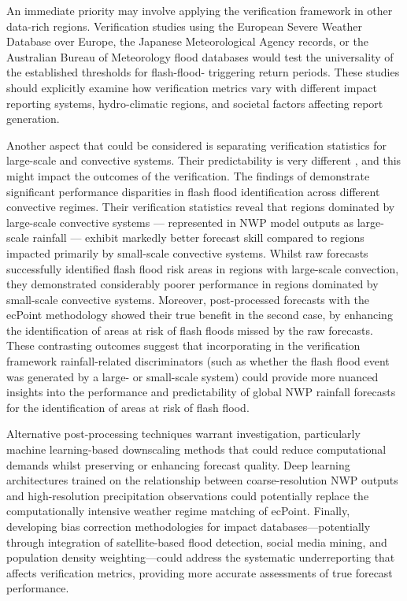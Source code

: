 An immediate priority may involve applying the verification framework in other data-rich regions. Verification studies using the European Severe Weather Database over Europe, the Japanese Meteorological Agency records, or the Australian Bureau of Meteorology flood databases would test the universality of the established thresholds for flash-flood- triggering return periods. These studies should explicitly examine how verification metrics vary with different impact reporting systems, hydro-climatic regions, and societal factors affecting report generation.

Another aspect that could be considered is separating verification statistics for large-scale and convective systems. Their predictability is very different \citep{}, and this might impact the outcomes of the verification. The findings of \citet{Pillosu_2024} demonstrate significant performance disparities in flash flood identification across different convective regimes. Their verification statistics reveal that regions dominated by large-scale convective systems — represented in NWP model outputs as large-scale rainfall — exhibit markedly better forecast skill compared to regions impacted primarily by small-scale convective systems. Whilst raw forecasts successfully identified flash flood risk areas in regions with large-scale convection, they demonstrated considerably poorer performance in regions dominated by small-scale convective systems. Moreover, post-processed forecasts with the ecPoint methodology showed their true benefit in the second case, by enhancing the identification of areas at risk of flash floods missed by the raw forecasts. These contrasting outcomes suggest that incorporating in the verification framework rainfall-related discriminators (such as whether the flash flood event was generated by a large- or small-scale system) could provide more nuanced insights into the performance and predictability of global NWP rainfall forecasts for the identification of areas at risk of flash flood.

Alternative post-processing techniques warrant investigation, particularly machine learning-based downscaling methods that could reduce computational demands whilst preserving or enhancing forecast quality. Deep learning architectures trained on the relationship between coarse-resolution NWP outputs and high-resolution precipitation observations could potentially replace the computationally intensive weather regime matching of ecPoint. Finally, developing bias correction methodologies for impact databases—potentially through integration of satellite-based flood detection, social media mining, and population density weighting—could address the systematic underreporting that affects verification metrics, providing more accurate assessments of true forecast performance.


